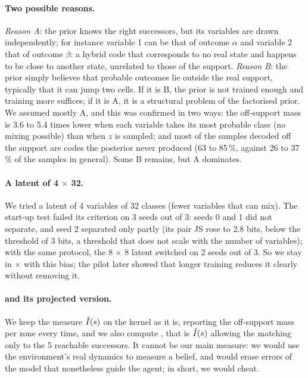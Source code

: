 \documentclass[10pt]{article}
\begin{document}
\paragraph{Two possible reasons.}
\emph{Reason A}: the prior knows the right successors, but its variables are drawn independently; for instance variable
1 can be that of outcome $\alpha$ and variable 2 that of outcome $\beta$: a hybrid code that corresponds to no real %
state and happens to be close to another state, unrelated to those of the support.
\emph{Reason B}: the prior simply believes that probable outcomes lie outside the real support, typically that it can jump
two cells.
If it is B, the prior is not trained enough and training more suffices; if it is A, it is a structural problem of the
factorised prior.
We assumed mostly A, and this was confirmed in two ways: the off-support mass is 3.6 to 5.4 times lower when each %
variable takes its most probable class (no mixing possible) than when $z$ is sampled; and most of the samples decoded off
the support are codes the posterior never produced (63 to 85\,\%, against 26 to 37\,\% of the samples in general). %
Some B remains, but A dominates.

\paragraph{A latent of 4 $\times$ 32.} %
We tried a latent of 4 variables of 32 classes (fewer variables that can mix). The start-up test failed its criterion %
on 3 seeds out of 3: seeds 0 and 1 did not separate, and seed 2 separated only partly (its pair JS rose to 2.8 bits, %
below the threshold of 3 bits, a threshold that does not scale with the number of variables); with the same protocol, %
the 8 $\times$ 8 latent switched on 2 seeds out of 3. %
So we stay in \eThreeLatentVars$\times$\eThreeLatentClasses{} with this bias; the pilot later showed that longer
training reduces it clearly without removing it.

\paragraph{\Is{} and its projected version.}
We keep the measure $\hat{I}(s)$ on the kernel as it is, reporting the off-support mass per zone every time, and we also
compute \Isproj, that is $\hat{I}(s)$ allowing the matching only to the 5 reachable successors. %
It cannot be our main measure: we would use the environment's real dynamics to measure a belief, and would erase errors
of the model that nonetheless guide the agent; in short, we would cheat.
\end{document}

